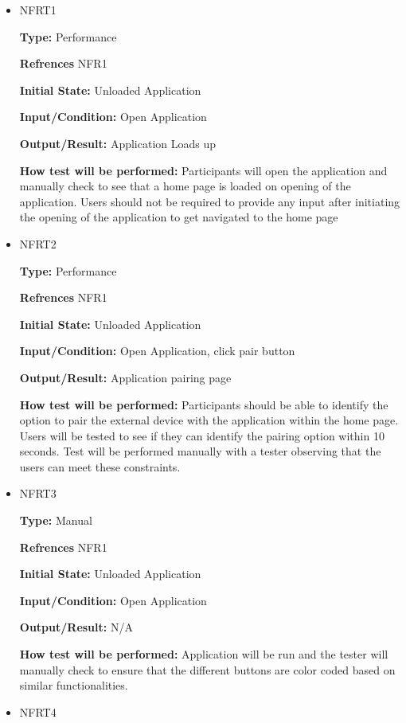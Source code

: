 \documentclass[12pt, titlepage]{article}
\begin{document}
\begin{itemize}


\item{NFRT1}

\textbf{Type:} Performance

\textbf{Refrences} NFR1
					
\textbf{Initial State:} Unloaded Application
					
\textbf{Input/Condition:} Open Application
					
\textbf{Output/Result:} Application Loads up
					
\textbf{How test will be performed:} Participants will open the application and manually check to see that a home page is loaded on opening of the application. Users should not be required to provide any input after initiating the opening of the application to get navigated to the home page

\item{NFRT2}

\textbf{Type:} Performance

\textbf{Refrences} NFR1
					
\textbf{Initial State:} Unloaded Application
					
\textbf{Input/Condition:} Open Application, click pair button
					
\textbf{Output/Result:} Application pairing page
					
\textbf{How test will be performed:} Participants should be able to identify the option to pair the external device with the application within the home page. Users will be tested to see if they can identify the pairing option within 10 seconds. Test will be performed manually with a tester observing that the users can meet these constraints.

\item{NFRT3}

\textbf{Type:} Manual

\textbf{Refrences} NFR1
					
\textbf{Initial State:} Unloaded Application
					
\textbf{Input/Condition:} Open Application
					
\textbf{Output/Result:} N/A
					
\textbf{How test will be performed:} Application will be run and the tester will manually check to ensure that the different buttons are color coded based on similar functionalities.


\item{NFRT4}


\end{itemize}
\end{document}
